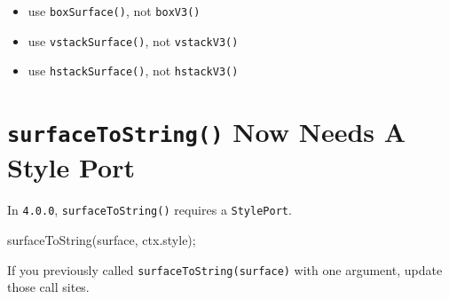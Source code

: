 \begin{itemize}
\tightlist
\item
  use \texttt{b\allowbreak{}o\allowbreak{}x\allowbreak{}S\allowbreak{}u\allowbreak{}r\allowbreak{}f\allowbreak{}a\allowbreak{}c\allowbreak{}e\allowbreak{}(\allowbreak{})}, not \texttt{b\allowbreak{}o\allowbreak{}x\allowbreak{}V\allowbreak{}3\allowbreak{}(\allowbreak{})}
\item
  use \texttt{v\allowbreak{}s\allowbreak{}t\allowbreak{}a\allowbreak{}c\allowbreak{}k\allowbreak{}S\allowbreak{}u\allowbreak{}r\allowbreak{}f\allowbreak{}a\allowbreak{}c\allowbreak{}e\allowbreak{}(\allowbreak{})}, not \texttt{v\allowbreak{}s\allowbreak{}t\allowbreak{}a\allowbreak{}c\allowbreak{}k\allowbreak{}V\allowbreak{}3\allowbreak{}(\allowbreak{})}
\item
  use \texttt{h\allowbreak{}s\allowbreak{}t\allowbreak{}a\allowbreak{}c\allowbreak{}k\allowbreak{}S\allowbreak{}u\allowbreak{}r\allowbreak{}f\allowbreak{}a\allowbreak{}c\allowbreak{}e\allowbreak{}(\allowbreak{})}, not \texttt{h\allowbreak{}s\allowbreak{}t\allowbreak{}a\allowbreak{}c\allowbreak{}k\allowbreak{}V\allowbreak{}3\allowbreak{}(\allowbreak{})}
\end{itemize}

\section{\texorpdfstring{\texttt{s\allowbreak{}u\allowbreak{}r\allowbreak{}f\allowbreak{}a\allowbreak{}c\allowbreak{}e\allowbreak{}T\allowbreak{}o\allowbreak{}S\allowbreak{}t\allowbreak{}r\allowbreak{}i\allowbreak{}n\allowbreak{}g\allowbreak{}(\allowbreak{})} Now Needs A Style Port}{ Now Needs A Style Port}}\label{record-010-surfacetostring-now-needs-a-style-port}

In \texttt{4\allowbreak{}.\allowbreak{}0\allowbreak{}.\allowbreak{}0}, \texttt{s\allowbreak{}u\allowbreak{}r\allowbreak{}f\allowbreak{}a\allowbreak{}c\allowbreak{}e\allowbreak{}T\allowbreak{}o\allowbreak{}S\allowbreak{}t\allowbreak{}r\allowbreak{}i\allowbreak{}n\allowbreak{}g\allowbreak{}(\allowbreak{})} requires a \texttt{S\allowbreak{}t\allowbreak{}y\allowbreak{}l\allowbreak{}e\allowbreak{}P\allowbreak{}o\allowbreak{}r\allowbreak{}t}.

\begin{CodeBlock}
surfaceToString(surface, ctx.style);
\end{CodeBlock}

If you previously called \texttt{s\allowbreak{}u\allowbreak{}r\allowbreak{}f\allowbreak{}a\allowbreak{}c\allowbreak{}e\allowbreak{}T\allowbreak{}o\allowbreak{}S\allowbreak{}t\allowbreak{}r\allowbreak{}i\allowbreak{}n\allowbreak{}g\allowbreak{}(\allowbreak{}s\allowbreak{}u\allowbreak{}r\allowbreak{}f\allowbreak{}a\allowbreak{}c\allowbreak{}e\allowbreak{})} with one argument, update those call sites.

